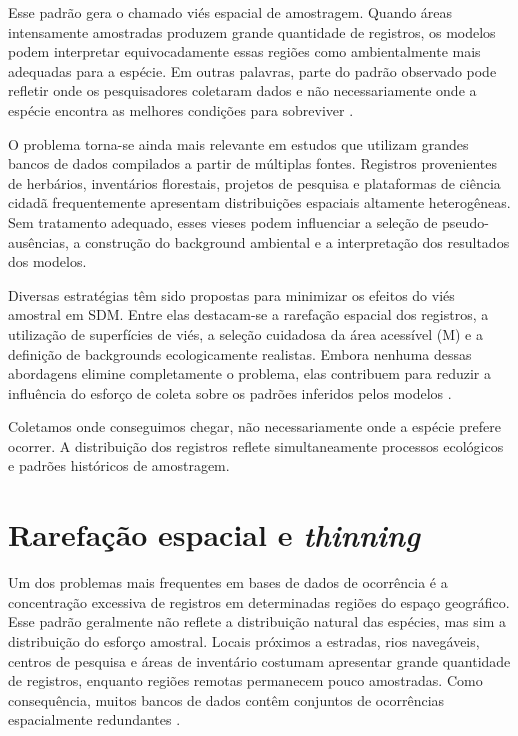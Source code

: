 Esse padrão gera o chamado viés espacial de amostragem. Quando áreas intensamente amostradas produzem grande quantidade de registros, os modelos podem interpretar equivocadamente essas regiões como ambientalmente mais adequadas para a espécie. Em outras palavras, parte do padrão observado pode refletir onde os pesquisadores coletaram dados e não necessariamente onde a espécie encontra as melhores condições para sobreviver \parencite{elith2011statistical}.

O problema torna-se ainda mais relevante em estudos que utilizam grandes bancos de dados compilados a partir de múltiplas fontes. Registros provenientes de herbários, inventários florestais, projetos de pesquisa e plataformas de ciência cidadã frequentemente apresentam distribuições espaciais altamente heterogêneas. Sem tratamento adequado, esses vieses podem influenciar a seleção de pseudo-ausências, a construção do background ambiental e a interpretação dos resultados dos modelos.

Diversas estratégias têm sido propostas para minimizar os efeitos do viés amostral em SDM. Entre elas destacam-se a rarefação espacial dos registros, a utilização de superfícies de viés, a seleção cuidadosa da área acessível (M) e a definição de backgrounds ecologicamente realistas. Embora nenhuma dessas abordagens elimine completamente o problema, elas contribuem para reduzir a influência do esforço de coleta sobre os padrões inferidos pelos modelos \parencite{barve2011critical,phillips2009sample}.

\begin{atencao}[title={\faExclamationTriangle\quad Esforço amostral não é adequabilidade ambiental}]
	Coletamos onde conseguimos chegar, não necessariamente onde a espécie prefere ocorrer. A distribuição dos registros reflete simultaneamente processos ecológicos e padrões históricos de amostragem.
\end{atencao}

\section{Rarefação espacial e \textit{thinning}}

Um dos problemas mais frequentes em bases de dados de ocorrência é a concentração excessiva de registros em determinadas regiões do espaço geográfico. Esse padrão geralmente não reflete a distribuição natural das espécies, mas sim a distribuição do esforço amostral. Locais próximos a estradas, rios navegáveis, centros de pesquisa e áreas de inventário costumam apresentar grande quantidade de registros, enquanto regiões remotas permanecem pouco amostradas. Como consequência, muitos bancos de dados contêm conjuntos de ocorrências espacialmente redundantes \parencite{phillips2009sample,guisan2017habitat}.

